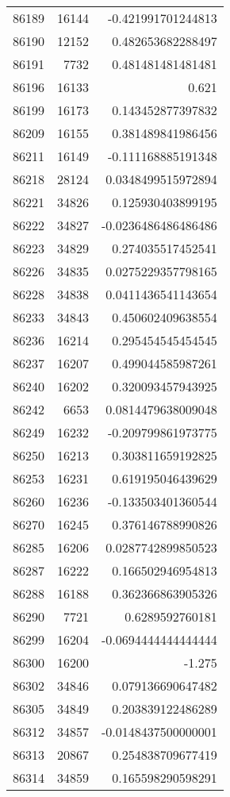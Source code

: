 \begin{tabular}{r | r | r}
86189 & 16144 & -0.421991701244813 \\
86190 & 12152 & 0.482653682288497 \\
86191 & 7732 & 0.481481481481481 \\
86196 & 16133 & 0.621 \\
86199 & 16173 & 0.143452877397832 \\
86209 & 16155 & 0.381489841986456 \\
86211 & 16149 & -0.111168885191348 \\
86218 & 28124 & 0.0348499515972894 \\
86221 & 34826 & 0.125930403899195 \\
86222 & 34827 & -0.0236486486486486 \\
86223 & 34829 & 0.274035517452541 \\
86226 & 34835 & 0.0275229357798165 \\
86228 & 34838 & 0.0411436541143654 \\
86233 & 34843 & 0.450602409638554 \\
86236 & 16214 & 0.295454545454545 \\
86237 & 16207 & 0.499044585987261 \\
86240 & 16202 & 0.320093457943925 \\
86242 & 6653 & 0.0814479638009048 \\
86249 & 16232 & -0.209799861973775 \\
86250 & 16213 & 0.303811659192825 \\
86253 & 16231 & 0.619195046439629 \\
86260 & 16236 & -0.133503401360544 \\
86270 & 16245 & 0.376146788990826 \\
86285 & 16206 & 0.0287742899850523 \\
86287 & 16222 & 0.166502946954813 \\
86288 & 16188 & 0.362366863905326 \\
86290 & 7721 & 0.6289592760181 \\
86299 & 16204 & -0.0694444444444444 \\
86300 & 16200 & -1.275 \\
86302 & 34846 & 0.079136690647482 \\
86305 & 34849 & 0.203839122486289 \\
86312 & 34857 & -0.0148437500000001 \\
86313 & 20867 & 0.254838709677419 \\
86314 & 34859 & 0.165598290598291 \\

\end{tabular}
